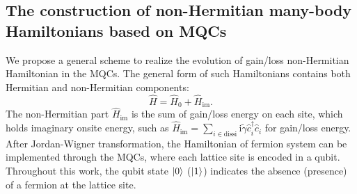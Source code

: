 \documentclass[longbibliography, aps, prx, amsmath, amssymb, amsfonts, twocolumn,superscriptaddress, footinbib]{revtex4-1}
\begin{document}

	\subsection{The construction of non-Hermitian many-body Hamiltonians based on MQCs~\label{sec:scheme_method}}

	We propose a general scheme to realize the evolution of gain/loss non-Hermitian Hamiltonian in the MQCs.
	The general form of such Hamiltonians contains both Hermitian and non-Hermitian components:
	\begin{equation}
		\hat{H} = \hat{H}_0 +\hat{H}_{\text{im}}. \label{eq:non-hermitian}
	\end{equation}
	The non-Hermitian part $\hat{H}_{\text{im}}$ is the sum of gain/loss energy on each site, which holds imaginary onsite energy, such as $\hat{H}_{\text{im}} = \sum_{i\in \text{dissi}} \mathrm{i}\tilde{\gamma} \hat{c}_i^{\dagger} \hat{c}_i$ for gain/loss energy. 
	After Jordan-Wigner transformation, the Hamiltonian of fermion system can be implemented through the MQCs, where each lattice site is encoded in a qubit. 
	Throughout this work, the qubit state $\ket{0}$ ($\ket{1}$) indicates the absence (presence) of a fermion at the lattice site.
\end{document}
